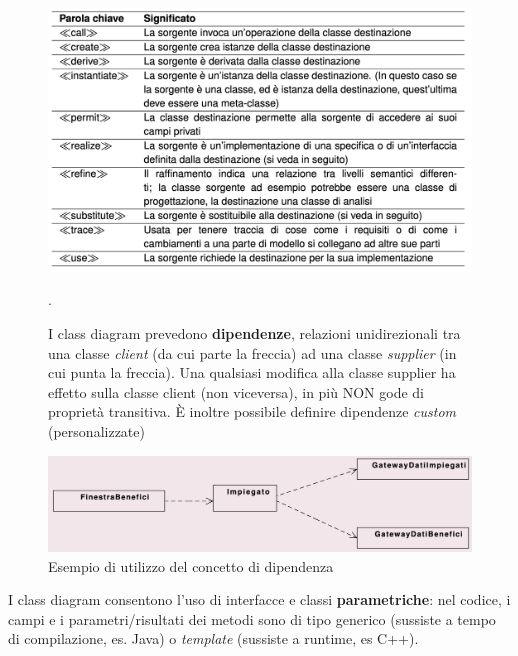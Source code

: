 \begin{figure}[H]
    \centering
    \includegraphics[width=1\linewidth]{assets/UML/class/class-10.png}
    \caption{I class diagram prevedono \textbf{dipendenze}, relazioni unidirezionali tra una classe \textit{client} (da cui parte la freccia) ad una classe \textit{supplier} (in cui punta la freccia). Una qualsiasi modifica alla classe supplier ha effetto sulla classe client (non viceversa), in più NON gode di proprietà transitiva. È inoltre possibile definire dipendenze \textit{custom} (personalizzate)}.
\end{figure}

\begin{figure}[H]
    \centering
    \includegraphics[width=1\linewidth]{assets/UML/class/class-5.png}
    \caption{Esempio di utilizzo del concetto di dipendenza}
\end{figure}

I class diagram consentono l'uso di interfacce e classi \textbf{parametriche}: nel codice, i campi e i parametri/risultati dei metodi sono di tipo generico (sussiste a tempo di compilazione, es. Java) o \textit{template} (sussiste a runtime, es C++).

